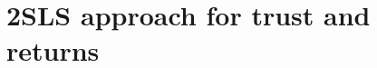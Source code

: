 \onlyinsubfile{\setcounter{section}{4}}
\section{2SLS approach for trust and returns}\notinsubfile{\label{sec:2sls}}
